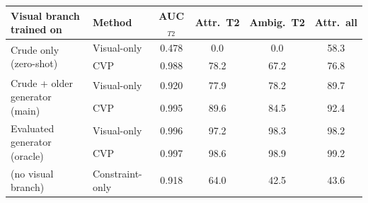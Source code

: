 \begin{tabular}{llcccc}
\toprule
Visual branch trained on & Method & AUC$_{T2}$ & Attr.\ T2 & Ambig.\ T2 & Attr.\ all\\
\midrule
\multirow{2}{*}{Crude only (zero-shot)} & Visual-only & 0.478 & 0.0 & 0.0 & 58.3\\
 & CVP & 0.988 & 78.2 & 67.2 & 76.8\\
\midrule
\multirow{2}{*}{Crude + older generator (main)} & Visual-only & 0.920 & 77.9 & 78.2 & 89.7\\
 & CVP & 0.995 & 89.6 & 84.5 & 92.4\\
\midrule
\multirow{2}{*}{Evaluated generator (oracle)} & Visual-only & 0.996 & 97.2 & 98.3 & 98.2\\
 & CVP & 0.997 & 98.6 & 98.9 & 99.2\\
\midrule
(no visual branch) & Constraint-only & 0.918 & 64.0 & 42.5 & 43.6\\
\bottomrule
\end{tabular}

